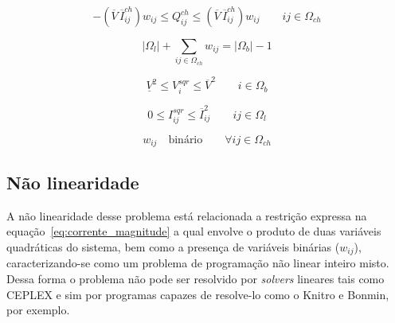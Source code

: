     
\begin{equation*}
    -(\overline{V}\,\overline{I}_{ij}^{ch})w_{ij} \leq Q_{ij}^{ch} \leq (\overline{V}\,\overline{I}_{ij}^{ch})w_{ij}\qquad ij\in\Omega_{ch}   
\end{equation*}
    
\begin{equation*}
    |\Omega_{l}| + \sum_{ij\in\Omega_{ch}}w_{ij} = |\Omega_{b}| - 1
\end{equation*}

\begin{equation*}
    \underline{V}^{2} \leq V_{i}^{sqr} \leq \overline{V}^{2}\qquad i \in\Omega_{b}
\end{equation*}

\begin{equation*}
    0 \leq I_{ij}^{sqr} \leq \overline{I}_{ij}^{2} \qquad ij\in\Omega_{l} 
\end{equation*}

\begin{equation*}
    w_{ij}\quad\text{binário}\qquad\forall ij \in\Omega_{ch}
\end{equation*}

\subsection{Não linearidade}

A não linearidade desse problema está relacionada a restrição expressa na equação~\ref{eq:corrente_magnitude} a qual envolve o produto de duas variáveis quadráticas do sistema, bem como a presença de variáveis binárias ($w_{ij}$), caracterizando-se como um problema de programação não linear inteiro misto.
Dessa forma o problema não pode ser resolvido por \emph{solvers} lineares tais como CEPLEX e sim por programas capazes de resolve-lo como o Knitro e Bonmin, por exemplo.

